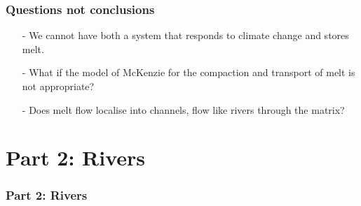 \documentclass[aspectratio=169]{beamer}
\begin{document}
\begin{frame}
    \frametitle{Questions not conclusions}
    \begin{itemize}
        \item[-]{We cannot have both a system that responds to climate change and stores melt.}
        \item[-]{What if the model of McKenzie for the compaction and transport of melt is not appropriate?}
        \item[-]{Does melt flow localise into channels, flow like rivers through the matrix?}
    \end{itemize}
\end{frame}

\section{Part 2: Rivers}

{
\begin{frame}
    \frametitle{Part 2: Rivers}
\end{frame}
}
\end{document}
